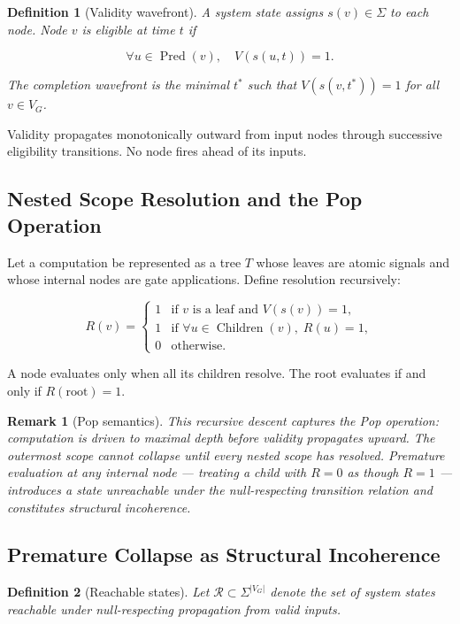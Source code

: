 \documentclass[11pt]{article}
\newtheorem{definition}{Definition}
\newtheorem{remark}{Remark}
\theoremstyle{remark}
\begin{document}
\begin{definition}[Validity wavefront]
A system state assigns $s(v) \in \Sigma$ to each node. Node $v$ is \emph{eligible} at time $t$ if

\[
\forall u \in \operatorname{Pred}(v),\quad V(s(u,t)) = 1.
\]

The \emph{completion wavefront} is the minimal $t^*$ such that $V(s(v, t^*)) = 1$ for all $v \in V_G$.
\end{definition}

Validity propagates monotonically outward from input nodes through successive eligibility transitions. No node fires ahead of its inputs.

\subsection{Nested Scope Resolution and the Pop Operation}

Let a computation be represented as a tree $T$ whose leaves are atomic signals and whose internal nodes are gate applications. Define resolution recursively:

\[
R(v) = \begin{cases} 1 & \text{if } v \text{ is a leaf and } V(s(v)) = 1, \\ 1 & \text{if } \forall u \in \operatorname{Children}(v),\; R(u) = 1, \\ 0 & \text{otherwise.} \end{cases}
\]

A node evaluates only when all its children resolve. The root evaluates if and only if $R(\text{root}) = 1$.

\begin{remark}[Pop semantics]
This recursive descent captures the Pop operation: computation is driven to maximal depth before validity propagates upward. The outermost scope cannot collapse until every nested scope has resolved. Premature evaluation at any internal node --- treating a child with $R = 0$ as though $R = 1$ --- introduces a state unreachable under the null-respecting transition relation and constitutes structural incoherence.
\end{remark}

\subsection{Premature Collapse as Structural Incoherence}

\begin{definition}[Reachable states]
Let $\mathcal{R} \subset \Sigma^{|V_G|}$ denote the set of system states reachable under null-respecting propagation from valid inputs.
\end{definition}
\end{document}
